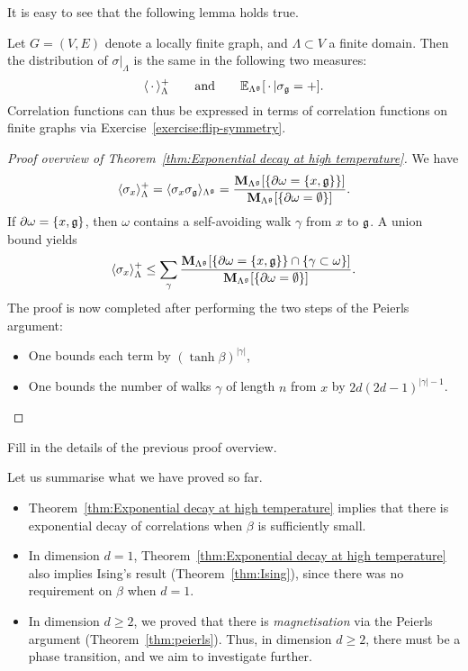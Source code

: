 It is easy to see that the following lemma holds true.

\begin{lemma}
    \label{lemma:ghost}
    Let $G=(V,E)$ denote a locally finite graph,
    and $\Lambda\subset V$ a finite domain.
    Then the distribution of $\sigma|_{\Lambda}$ is the same in the following
    two measures:
    \[
        \langle\blank\rangle_{\Lambda}^+
        \qquad\text{and}\qquad
        \E_{\Lambda^\frakg}[\blank|\sigma_\frakg=+].
    \]
    Correlation functions can thus be expressed in terms of correlation functions
    on finite graphs via Exercise~\ref{exercise:flip-symmetry}.
\end{lemma}

\begin{proof}[Proof overview of Theorem~\ref{thm:Exponential decay at high temperature}]
    We have
    \[
        \langle\sigma_x\rangle_{\Lambda}^+
        =
        \langle\sigma_x\sigma_\mathfrak g\rangle_{\Lambda^\mathfrak g}
        =
        \frac{
        \mathbf{M}_{\Lambda^\mathfrak g}[\{\partial\omega=\{x,\mathfrak g\}\}]
        }{
        \mathbf{M}_{\Lambda^\mathfrak g}[\{\partial\omega=\emptyset\}]
        }.
    \]
    If $\partial\omega=\{x,\mathfrak g\}$, then $\omega$ contains a self-avoiding
    walk $\gamma$ from $x$ to $\mathfrak g$.
    A union bound yields
    \[
        \langle\sigma_x\rangle_{\Lambda}^+
        \leq
        \sum_{\gamma}\frac{\mathbf{M}_{\Lambda^\mathfrak g}[\{\partial\omega=\{x,\mathfrak g\}\}\cap\{\gamma\subset\omega\}]}{\mathbf{M}_{\Lambda^\mathfrak g}[\{\partial\omega=\emptyset\}]}.
    \]
    The proof is now completed after performing the two steps of the Peierls argument:
    \begin{itemize}
        \item One bounds each term by $(\tanh\beta)^{|\gamma|}$,
        \item One bounds the number of walks $\gamma$ of length $n$ from $x$ by $2d(2d-1)^{|\gamma|-1}$.
    \end{itemize} 
    \qedhere
\end{proof}

\begin{exercise}
    Fill in the details of the previous proof overview.
\end{exercise}

Let us summarise what we have proved so far.
\begin{itemize}
    \item Theorem~\ref{thm:Exponential decay at high temperature}
    implies that there is exponential decay of correlations when $\beta$ is sufficiently small.
    \item In dimension $d=1$, Theorem~\ref{thm:Exponential decay at high temperature} also implies Ising's result (Theorem~\ref{thm:Ising}),
    since there was no requirement on $\beta$ when $d=1$.
    \item In dimension $d\geq 2$, we proved that there is \emph{magnetisation} via the
    Peierls argument (Theorem~\ref{thm:peierls}).
    Thus, in dimension $d\geq 2$, there must be a phase transition,
    and we aim to investigate further.
\end{itemize}

